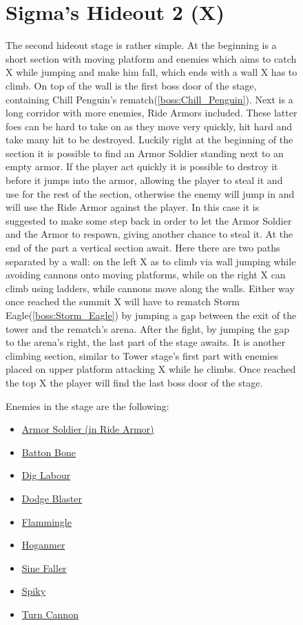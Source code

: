 \begin{figure}[htp]
\section{Sigma's Hideout 2 (X)}
The second hideout stage is rather simple. At the beginning is a short section with moving platform and enemies which aims to catch X while jumping and make him fall, which ends with a wall X has to climb. On top of the wall is the first boss door of the stage, containing Chill Penguin's rematch(\ref{boss:Chill_Penguin}). Next is a long corridor with more enemies, Ride Armors included. These latter foes can be hard to take on as they move very quickly, hit hard and take many hit to be destroyed. Luckily right at the beginning of the section it is possible to find an Armor Soldier standing next to an empty armor. If the player act quickly it is possible to destroy it before it jumps into the armor, allowing the player to steal it and use for the rest of the section, otherwise the enemy will jump in and will use the Ride Armor against the player. In this case it is suggested to make some step back in order to let the Armor Soldier and the Armor to respawn, giving another chance to steal it. At the end of the part a vertical section await. Here there are two paths separated by a wall: on the left X as to climb via wall jumping while avoiding cannons onto moving platforms, while on the right X can climb using ladders, while cannons move along the walls. Either way once reached the summit X will have to rematch Storm Eagle(\ref{boss:Storm_Eagle}) by jumping a gap between the exit of the tower and the rematch's arena. After the fight, by jumping the gap to the arena's right, the last part of the stage awaits. It is another climbing section, similar to Tower stage's first part with enemies placed on upper platform attacking X while he climbs. Once reached the top X the player will find the last boss door of the stage.

Enemies in the stage are the following\cite{wiki:sigma_stages}:
\begin{itemize}
	\item \hyperlink{enem:Armor_Soldier}{Armor Soldier (in Ride Armor)}
	\item \hyperlink{enem:Batton_Bone}{Batton Bone}
	\item \hyperlink{enem:Dig_Labour}{Dig Labour}
	\item \hyperlink{enem:Dodge_Blaster}{Dodge Blaster}
	\item \hyperlink{enem:Flammingle}{Flammingle}
	\item \hyperlink{enem:Hoganmer}{Hoganmer}
	\item \hyperlink{enem:Sine_Faller}{Sine Faller}
	\item \hyperlink{enem:Spiky}{Spiky}
	\item \hyperlink{enem:Turn_Cannon}{Turn Cannon}
\end{itemize} 


\end{figure}
